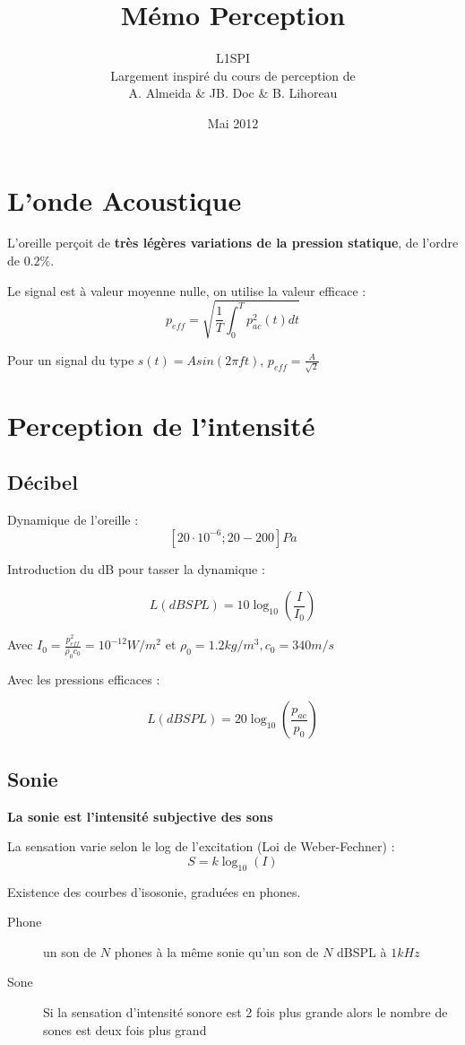 \documentclass[a4paper, 11pt]{article}
\title{Mémo Perception}
\author{L1SPI\\
        Largement inspiré du cours de perception de \\
        A. Almeida \& JB. Doc \& B. Lihoreau}
\date{Mai 2012}
\begin{document}
	\maketitle

    \section{L'onde Acoustique}

    L'oreille perçoit de {\bf très légères variations de la pression statique}, de l'ordre de $0.2\%$.

    Le signal est à valeur moyenne nulle, on utilise la valeur efficace :
    $$p_{eff} = \sqrt{\frac{1}{T}\int_0^Tp^2_{ac}(t) dt}$$

    Pour un signal du type $s(t) = Asin(2\pi ft)$, $p_{eff} = \frac{A}{\sqrt{2}}$

    \section{Perception de l'intensité}

    \subsection{Décibel}

    Dynamique de l'oreille :
    $$[20\cdot10^{-6} ; 20 - 200] Pa$$

    Introduction du dB pour tasser la dynamique :

    $$L(dBSPL) = 10\log_{10}\left(\frac{I}{I_0}\right)$$

    Avec $I_0 = \frac{p^2_{eff}}{\rho_0c_0} = 10^{-12}W/m^2$ et $\rho_0 = 1.2kg/m^3, c_0 = 340m/s$

    Avec les pressions efficaces :

    $$L(dBSPL) = 20\log_{10}\left(\frac{p_{ac}}{p_0}\right)$$

    \subsection{Sonie}

    {\bf La sonie est l'intensité subjective des sons}

    La sensation varie selon le log de l'excitation (Loi de Weber-Fechner) :
    $$S= k\log_{10}(I)$$

    Existence des courbes d'isosonie, graduées en phones.

    \begin{description}
        \item[Phone] un son de $N$ phones à la même sonie qu'un son de $N$ dBSPL à $1kHz$
        \item[Sone] Si la sensation d'intensité sonore est 2 fois plus grande alors le nombre de sones est deux fois plus grand
    \end{description}
\end{document}
